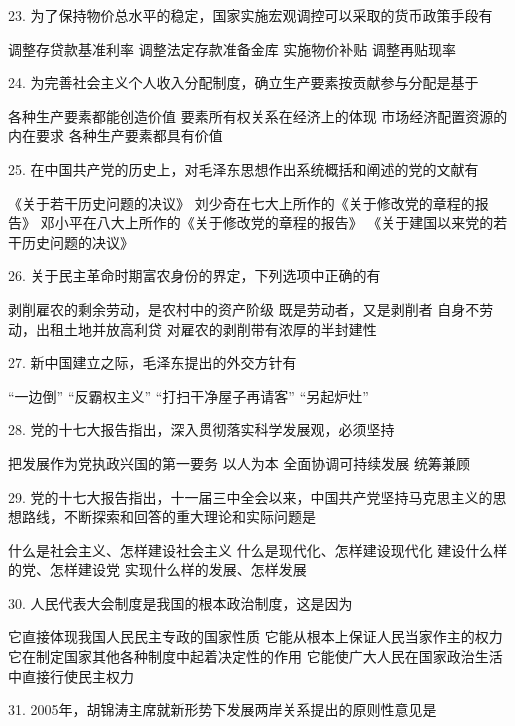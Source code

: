 23. 为了保持物价总水平的稳定，国家实施宏观调控可以采取的货币政策手段有
\begin{choices}
	 调整存贷款基准利率
	 调整法定存款准备金库
	 实施物价补贴
	 调整再贴现率
\end{choices}
24. 为完善社会主义个人收入分配制度，确立生产要素按贡献参与分配是基于
\begin{choices}
	 各种生产要素都能创造价值
	 要素所有权关系在经济上的体现
	 市场经济配置资源的内在要求
	 各种生产要素都具有价值
\end{choices}
25. 在中国共产党的历史上，对毛泽东思想作出系统概括和阐述的党的文献有
\begin{choices}
	 《关于若干历史问题的决议》
	 刘少奇在七大上所作的《关于修改党的章程的报告》
	 邓小平在八大上所作的《关于修改党的章程的报告》
	 《关于建国以来党的若干历史问题的决议》
\end{choices}
26. 关于民主革命时期富农身份的界定，下列选项中正确的有
\begin{choices}
	 剥削雇农的剩余劳动，是农村中的资产阶级
	 既是劳动者，又是剥削者
	 自身不劳动，出租土地并放高利贷
	 对雇农的剥削带有浓厚的半封建性
\end{choices}
27. 新中国建立之际，毛泽东提出的外交方针有
\begin{choices}
	 “一边倒”
	 “反霸权主义”
	 “打扫干净屋子再请客”
	 “另起炉灶”
\end{choices}
28. 党的十七大报告指出，深入贯彻落实科学发展观，必须坚持
\begin{choices}
	 把发展作为党执政兴国的第一要务
	 以人为本
	 全面协调可持续发展
	 统筹兼顾
\end{choices}
29. 党的十七大报告指出，十一届三中全会以来，中国共产党坚持马克思主义的思想路线，不断探索和回答的重大理论和实际问题是
\begin{choices}
	 什么是社会主义、怎样建设社会主义
	 什么是现代化、怎样建设现代化
	 建设什么样的党、怎样建设党
	 实现什么样的发展、怎样发展
\end{choices}
30. 人民代表大会制度是我国的根本政治制度，这是因为
\begin{choices}
	 它直接体现我国人民民主专政的国家性质
	 它能从根本上保证人民当家作主的权力
	 它在制定国家其他各种制度中起着决定性的作用
	 它能使广大人民在国家政治生活中直接行使民主权力
\end{choices}
31. 2005年，胡锦涛主席就新形势下发展两岸关系提出的原则性意见是
